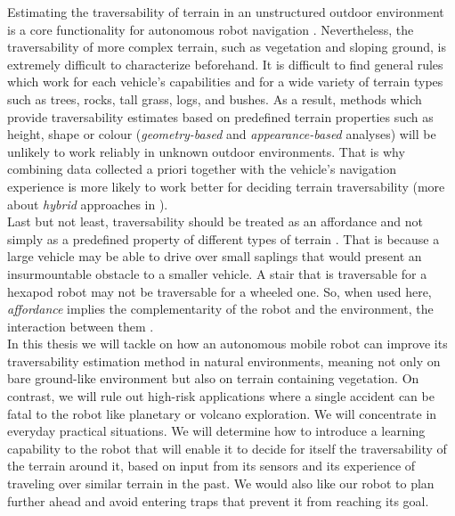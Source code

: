 \documentclass[12pt,a4paper,table,dvipsnames,tikz]{report}
\newcommand{\term}{\textit}
\begin{document}
	Estimating the traversability of terrain in an unstructured outdoor 
	environment is a core functionality for autonomous robot navigation \citep{Kim}. 
	Nevertheless, the traversability of more complex terrain, such as 
	vegetation and sloping ground, is extremely difficult to characterize beforehand. 
	It is difficult to find general rules which work for each vehicle's	capabilities
	and for a wide variety of terrain types such as trees, rocks, tall grass, logs, 
	and bushes. As a result, methods which provide traversability estimates 
	based on predefined terrain properties such as height, shape or colour 
	(\term{geometry-based} and \term{appearance-based} analyses) will be unlikely to 
	work reliably in unknown outdoor environments. That is why combining data 
	collected a priori together with the vehicle’s navigation experience is more 
	likely to work better for deciding terrain traversability (more about 
	\term{hybrid} approaches in \citet{Papadakis}).
	\\
	
	Last but not least, traversability should be treated as an affordance and 
	not simply as a predefined property of different types of terrain \citep{Kim}. 
	That is because a large vehicle may be able to drive over small saplings that 
	would present an insurmountable obstacle to a smaller vehicle. A stair that is 
	traversable for a hexapod robot may not be traversable for a wheeled one. So, 
	when used here, \term{affordance} implies the complementarity of the robot and 
	the environment, the interaction between them \citep{Ugur}.
	\\
	
	In this thesis we will tackle on how an autonomous mobile robot can improve its 
	traversability estimation method in natural environments, meaning not 
	only on bare ground-like environment but also on terrain containing vegetation. 
	On contrast, we will rule out high-risk applications where a single accident can 
	be fatal to the robot like planetary or volcano exploration. We will concentrate 
	in everyday practical situations. We will determine how to introduce a learning 
	capability to the robot that will enable it to decide for itself the 
	traversability of the terrain around it, based on input from its sensors 
	and its experience of traveling over similar terrain in the past. We would also 
	like our robot to plan further ahead and avoid entering traps that prevent it 
	from reaching its goal.
	\\\\
	
\end{document}
